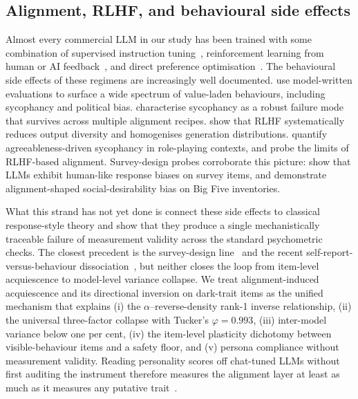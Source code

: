 \documentclass[11pt]{article}
\begin{document}
\subsection{Alignment, RLHF, and behavioural side effects}
\label{sec:related-alignment}

Almost every commercial LLM in our study has been trained with some combination of supervised instruction tuning~\citep{wei2022flan,ouyang2022training}, reinforcement learning from human or AI feedback~\citep{christiano2017deep,ouyang2022training,bai2022constitutional}, and direct preference optimisation~\citep{rafailov2023dpo}. The behavioural side effects of these regimens are increasingly well documented. \citet{perez2023discovering} use model-written evaluations to surface a wide spectrum of value-laden behaviours, including sycophancy and political bias. \citet{sharma2024sycophancy} characterise sycophancy as a robust failure mode that survives across multiple alignment recipes. \citet{kirk2023understanding} show that RLHF systematically reduces output diversity and homogenises generation distributions. \citet{zheng2024agreeableness} quantify agreeableness-driven sycophancy in role-playing contexts, and \citet{wang2024aligning} probe the limits of RLHF-based alignment. Survey-design probes corroborate this picture: \citet{tjuatja2023response} show that LLMs exhibit human-like response biases on survey items, and \citet{acerbi2024llm,salecha2024llm} demonstrate alignment-shaped social-desirability bias on Big Five inventories.

What this strand has not yet done is connect these side effects to classical response-style theory and show that they produce a single mechanistically traceable failure of measurement validity across the standard psychometric checks. The closest precedent is the survey-design line~\citep{tjuatja2023response,dominguez2024questioning} and the recent self-report-versus-behaviour dissociation~\citep{han2025personality}, but neither closes the loop from item-level acquiescence to model-level variance collapse. We treat alignment-induced acquiescence and its directional inversion on dark-trait items as the unified mechanism that explains (i) the $\alpha$--reverse-density rank-1 inverse relationship, (ii) the universal three-factor collapse with Tucker's $\varphi=0.993$, (iii) inter-model variance below one per cent, (iv) the item-level plasticity dichotomy between visible-behaviour items and a safety floor, and (v) persona compliance without measurement validity. Reading personality scores off chat-tuned LLMs without first auditing the instrument therefore measures the alignment layer at least as much as it measures any putative trait~\citep{serpell2024validity,laverghetta2022predicting}.
\end{document}
